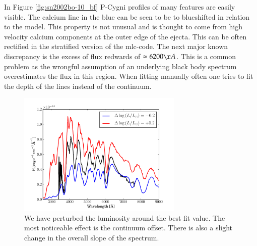 
In Figure \ref{fig:sn2002bo-10_bf} P-Cygni profiles of many features are easily visible. The calcium line in the blue can be seen to be to blueshifted in relation to the model. This property is not unusual and is thought to come from high velocity calcium components at the outer edge of the ejecta. This can be often rectified in the stratified version of the \gls{mlc}-code. The next major known discrepancy is the excess of flux redwards of  $\approx 6200 \AA$.  This is a common problem as the wrongful assumption of an underlying black body spectrum overestimates the flux in this region. When fitting manually often one tries to fit the depth of the lines instead of the continuum.

\begin{figure}[htbp] %
   \centering
   \includegraphics[width=0.7\textwidth]{chapter_dalek/plots/bf2002bo-10_lum.pdf} 
   \caption{We have perturbed the luminosity around the best fit value. The most noticeable effect is the continuum offset. There is also a slight change in the overall slope of the spectrum.} 
   \label{fig:sn2002bo_lum_offset}
\end{figure}

